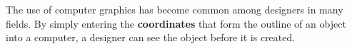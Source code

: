 \documentclass{article}
\begin{document}
    \begin{minipage}{0.4\linewidth}
        The use of computer graphics has become common among designers in many fields. By simply entering
        the \textbf{coordinates} that form the outline of an object into a computer, a designer can see the object before it is
        created.
    \end{minipage}

    














    
    
\end{document}
